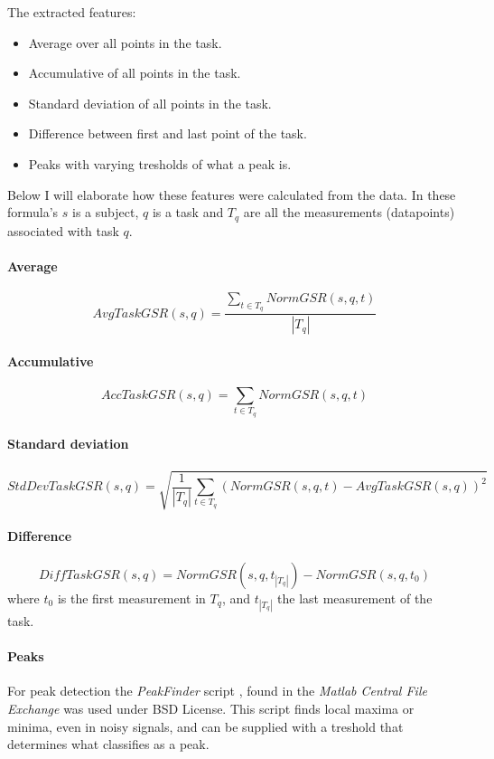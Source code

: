 \documentclass[11pt,leqno,letterpaper]{report} %
\begin{document}
The extracted features:

\begin{itemize}

\item Average over all points in the task.
\item Accumulative of all points in the task.
\item Standard deviation of all points in the task.
\item Difference between first and last point of the task.
\item Peaks with varying tresholds of what a peak is.
\end{itemize}

Below I will elaborate how these features were calculated from the data. In these formula's $s$ is a subject, $q$ is a task and $T_q$ are all the measurements (datapoints) associated with task $q$.

\paragraph{Average}

\[
AvgTaskGSR(s,q) = \frac { \sum_{t \in T_q} NormGSR(s,q,t) }
{\left\vert{T_q}\right\vert }
\]

\paragraph{Accumulative}

\[
AccTaskGSR(s,q) =  \sum_{t \in T_q} NormGSR(s,q,t)
\]

\paragraph{Standard deviation}

\[
StdDevTaskGSR(s,q) = \sqrt {\frac{1}{\left\vert{T_q}\right\vert}   \sum_{t \in T_q} (NormGSR(s,q,t) - AvgTaskGSR(s,q))^2 }
\]

\paragraph{Difference}

\[
DiffTaskGSR(s,q) = NormGSR(s,q, t_{\left\vert{T_q}\right\vert}) - NormGSR(s,q, t_0)
\]
where $t_0$ is the first measurement in $T_q$, and $t_{\left\vert{T_q}\right\vert}$ the last measurement of the task.

\paragraph{Peaks}
For peak detection the \emph{PeakFinder} script \citep{yoder}, found in the \emph{Matlab Central File Exchange} was used under BSD License. This script finds local maxima or minima, even in noisy signals, and can be supplied with a treshold that determines what classifies as a peak.
\end{document}

